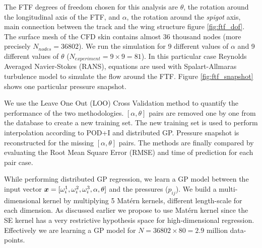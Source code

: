 The FTF degrees of freedom chosen for this analysis are $\theta$, the rotation around the longitudinal axis of the FTF, and $\alpha$, the rotation around the {\it spigot} axis, main connection between the track and the wing structure figure \ref{fig:ftf_dof}. The surface mesh of the CFD skin contains almost 36 thousand nodes (more precisely $N_{nodes} = 36802$). We run the simulation for 9 different values of $\alpha$ and 9 different values of $\theta$ ($N_{experiment} = 9\times9 = 81$). In this particular case Reynolds Averaged  Navier-Stokes (RANS), equations are used with Spalart-Allmaras turbulence model to simulate the flow around the FTF. Figure \ref{fig:ftf_snapshot} shows one particular pressure snapshot. 

We use the Leave One Out (LOO) Cross Validation method to quantify the performance of the two methodologies. $[\alpha, \theta]$ pairs are removed one by one from the database to create a new training set. The new training set is used to perform interpolation according to POD+I and distributed GP. Pressure snapshot is reconstructed for the missing $[\alpha, \theta]$ pairs. The methods are finally compared by evaluating the Root Mean Square Error (RMSE) and time of prediction for each pair case. 

While performing distributed GP regression, we learn a GP model between the input vector $\boldsymbol{x} = [\omega_{i}^{1}, \omega_{i}^{2}, \omega_{i}^{3}, \alpha, \theta]$ and the pressures ($p_{ij}$). We build a multi-dimensional kernel by multiplying 5 Mat\'ern kernels, different length-scale for each dimension. As discussed earlier we propose to use Mat\'ern kernel since the SE kernel has a very restrictive hypothesis space for high-dimensional regression.  Effectively we are learning a GP model for $N = 36802\times80 = 2.9$ million data-points. 

